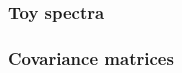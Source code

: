\documentclass[../thesis.tex]{subfiles}
\begin{document}
\subsubsection{Toy spectra}

\subsubsection{Covariance matrices}
\end{document}
